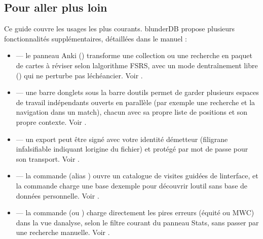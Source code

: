 \documentclass[letterpaper,10pt,dvipdfmx]{sphinxmanual}
\begin{document}
\subsection{Pour aller plus loin}
\label{\detokenize{guide_utilisateur:pour-aller-plus-loin}}
\sphinxAtStartPar
Ce guide couvre les usages les plus courants. blunderDB propose plusieurs
fonctionnalités supplémentaires, détaillées dans le manuel :
\begin{itemize}
\item {} 
\sphinxAtStartPar
{} — le panneau Anki () transforme une
collection ou une recherche en paquet de cartes à réviser selon
l\textquotesingle{}algorithme FSRS, avec un mode d\textquotesingle{}entraînement libre () qui ne
perturbe pas l\textquotesingle{}échéancier. Voir {\hyperref[\detokenize{manuel:panneau-anki}]{}}.

\item {} 
\sphinxAtStartPar
{} — une barre d\textquotesingle{}onglets sous la barre d\textquotesingle{}outils permet de
garder plusieurs espaces de travail indépendants ouverts en parallèle (par
exemple une recherche et la navigation dans un match), chacun avec sa
propre liste de positions et son propre contexte. Voir {\hyperref[\detokenize{manuel:onglets-vues}]{}}.

\item {} 
\sphinxAtStartPar
{} — un export peut être signé avec votre identité
d\textquotesingle{}émetteur (filigrane infalsifiable indiquant l\textquotesingle{}origine du fichier) et
protégé par mot de passe pour son transport. Voir {\hyperref[\detokenize{manuel:diffusion-controlee}]{}}.

\item {} 
\sphinxAtStartPar
{} — la commande 
(alias ) ouvre un catalogue de visites guidées de l\textquotesingle{}interface,
et la commande  charge une base d\textquotesingle{}exemple pour découvrir l\textquotesingle{}outil
sans base de données personnelle. Voir {\hyperref[\detokenize{manuel:visites-guidees}]{}}.

\item {} 
\sphinxAtStartPar
{} — la commande  (ou )
charge directement les pires erreurs (équité ou MWC) dans la vue
d\textquotesingle{}analyse, selon le filtre courant du panneau Stats, sans passer par une
recherche manuelle. Voir {\hyperref[\detokenize{manuel:stats}]{}}.

\end{itemize}
\end{document}
